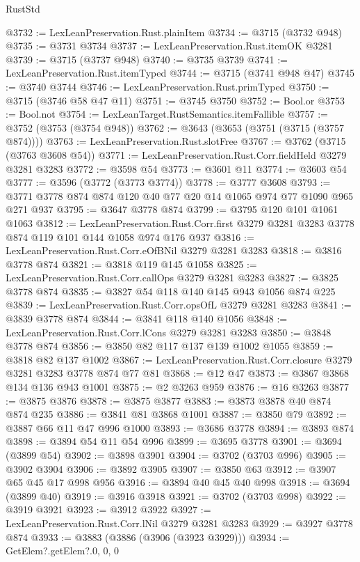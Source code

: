 \begin{lexlean}{RustStd}
\begin{coremodule}
@3732 := LexLeanPreservation.Rust.plainItem
@3734 := @3715 (@3732 @948)
@3735 := @3731 @3734
@3737 := LexLeanPreservation.Rust.itemOK @3281
@3739 := @3715 (@3737 @948)
@3740 := @3735 @3739
@3741 := LexLeanPreservation.Rust.itemTyped
@3744 := @3715 (@3741 @948 @47)
@3745 := @3740 @3744
@3746 := LexLeanPreservation.Rust.primTyped
@3750 := @3715 (@3746 @58 @47 @11)
@3751 := @3745 @3750
@3752 := Bool.or
@3753 := Bool.not
@3754 := LexLeanTarget.RustSemantics.itemFallible
@3757 := @3752 (@3753 (@3754 @948))
@3762 := @3643 (@3653 (@3751 (@3715 (@3757 @874))))
@3763 := LexLeanPreservation.Rust.slotFree
@3767 := @3762 (@3715 (@3763 @3608 @54))
@3771 := LexLeanPreservation.Rust.Corr.fieldHeld @3279 @3281 @3283
@3772 := @3598 @54
@3773 := @3601 @11
@3774 := @3603 @54
@3777 := @3596 (@3772 (@3773 @3774))
@3778 := @3777 @3608
@3793 := @3771 @3778 @874 @874 @120 @40 @77 @20 @14 @1065 @974 @77 @1090 @965 @271 @937
@3795 := @3647 @3778 @874
@3799 := @3795 @120 @101 @1061 @1063
@3812 := LexLeanPreservation.Rust.Corr.first
    @3279
    @3281
    @3283
    @3778
    @874
    @119
    @101
    @144
    @1058
    @974
    @176
    @937
@3816 := LexLeanPreservation.Rust.Corr.eOfBNil @3279 @3281 @3283
@3818 := @3816 @3778 @874
@3821 := @3818 @119 @145 @1058
@3825 := LexLeanPreservation.Rust.Corr.callOps @3279 @3281 @3283
@3827 := @3825 @3778 @874
@3835 := @3827 @54 @118 @140 @145 @943 @1056 @874 @225
@3839 := LexLeanPreservation.Rust.Corr.opsOfL @3279 @3281 @3283
@3841 := @3839 @3778 @874
@3844 := @3841 @118 @140 @1056
@3848 := LexLeanPreservation.Rust.Corr.lCons @3279 @3281 @3283
@3850 := @3848 @3778 @874
@3856 := @3850 @82 @117 @137 @139 @1002 @1055
@3859 := @3818 @82 @137 @1002
@3867 := LexLeanPreservation.Rust.Corr.closure @3279 @3281 @3283 @3778 @874 @77 @81
@3868 := @12 @47
@3873 := @3867 @3868 @134 @136 @943 @1001
@3875 := @2 @3263 @959
@3876 := @16 @3263
@3877 := @3875 @3876
@3878 := @3875 @3877
@3883 := @3873 @3878 @40 @874 @874 @235
@3886 := @3841 @81 @3868 @1001
@3887 := @3850 @79
@3892 := @3887 @66 @11 @47 @996 @1000
@3893 := @3686 @3778
@3894 := @3893 @874
@3898 := @3894 @54 @11 @54 @996
@3899 := @3695 @3778
@3901 := @3694 (@3899 @54)
@3902 := @3898 @3901
@3904 := @3702 (@3703 @996)
@3905 := @3902 @3904
@3906 := @3892 @3905
@3907 := @3850 @63
@3912 := @3907 @65 @45 @17 @998 @956
@3916 := @3894 @40 @45 @40 @998
@3918 := @3694 (@3899 @40)
@3919 := @3916 @3918
@3921 := @3702 (@3703 @998)
@3922 := @3919 @3921
@3923 := @3912 @3922
@3927 := LexLeanPreservation.Rust.Corr.lNil @3279 @3281 @3283
@3929 := @3927 @3778 @874
@3933 := @3883 (@3886 (@3906 (@3923 @3929)))
@3934 := GetElem?.getElem?.{0, 0, 0}

\end{coremodule}
\end{lexlean}
